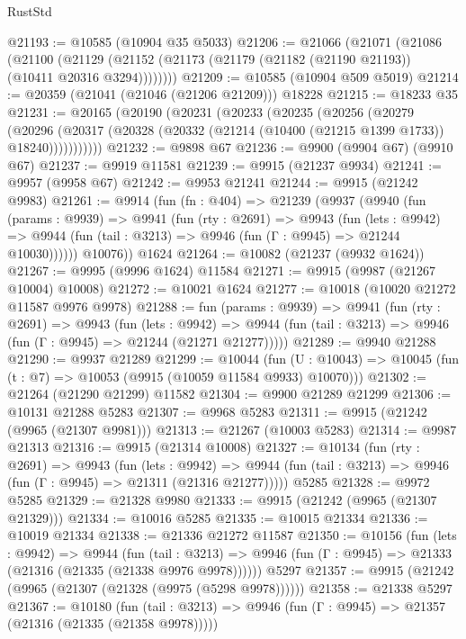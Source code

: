 \begin{lexlean}{RustStd}
\begin{coremodule}
@21193 := @10585 (@10904 @35 @5033)
@21206 := @21066
    (@21071
      (@21086
        (@21100
          (@21129 (@21152 (@21173 (@21179 (@21182 (@21190 @21193)) (@10411 @20316 @3294))))))))
@21209 := @10585 (@10904 @509 @5019)
@21214 := @20359 (@21041 (@21046 (@21206 @21209))) @18228
@21215 := @18233 @35
@21231 := @20165
    (@20190
      (@20231
        (@20233
          (@20235
            (@20256
              (@20279
                (@20296
                  (@20317 (@20328 (@20332 (@21214 (@10400 (@21215 @1399 @1733)) @18240)))))))))))
@21232 := @9898 @67
@21236 := @9900 (@9904 @67) (@9910 @67)
@21237 := @9919 @11581
@21239 := @9915 (@21237 @9934)
@21241 := @9957 (@9958 @67)
@21242 := @9953 @21241
@21244 := @9915 (@21242 @9983)
@21261 := @9914
    (fun (fn : @404) =>
    @21239
      (@9937
        (@9940
          (fun (params : @9939) =>
          @9941
            (fun (rty : @2691) =>
            @9943
              (fun (lets : @9942) =>
              @9944 (fun (tail : @3213) => @9946 (fun (Γ : @9945) => @21244 @10030))))))
        @10076))
    @1624
@21264 := @10082 (@21237 (@9932 @1624))
@21267 := @9995 (@9996 @1624) @11584
@21271 := @9915 (@9987 (@21267 @10004) @10008)
@21272 := @10021 @1624
@21277 := @10018 (@10020 @21272 @11587 @9976 @9978)
@21288 := fun (params : @9939) =>
  @9941
    (fun (rty : @2691) =>
    @9943
      (fun (lets : @9942) =>
      @9944 (fun (tail : @3213) => @9946 (fun (Γ : @9945) => @21244 (@21271 @21277)))))
@21289 := @9940 @21288
@21290 := @9937 @21289
@21299 := @10044
    (fun (U : @10043) => @10045 (fun (t : @7) => @10053 (@9915 (@10059 @11584 @9933) @10070)))
@21302 := @21264 (@21290 @21299) @11582
@21304 := @9900 @21289 @21299
@21306 := @10131 @21288 @5283
@21307 := @9968 @5283
@21311 := @9915 (@21242 (@9965 (@21307 @9981)))
@21313 := @21267 (@10003 @5283)
@21314 := @9987 @21313
@21316 := @9915 (@21314 @10008)
@21327 := @10134
    (fun (rty : @2691) =>
    @9943
      (fun (lets : @9942) =>
      @9944 (fun (tail : @3213) => @9946 (fun (Γ : @9945) => @21311 (@21316 @21277)))))
    @5285
@21328 := @9972 @5285
@21329 := @21328 @9980
@21333 := @9915 (@21242 (@9965 (@21307 @21329)))
@21334 := @10016 @5285
@21335 := @10015 @21334
@21336 := @10019 @21334
@21338 := @21336 @21272 @11587
@21350 := @10156
    (fun (lets : @9942) =>
    @9944
      (fun (tail : @3213) =>
      @9946 (fun (Γ : @9945) => @21333 (@21316 (@21335 (@21338 @9976 @9978))))))
    @5297
@21357 := @9915 (@21242 (@9965 (@21307 (@21328 (@9975 (@5298 @9978))))))
@21358 := @21338 @5297
@21367 := @10180
    (fun (tail : @3213) => @9946 (fun (Γ : @9945) => @21357 (@21316 (@21335 (@21358 @9978)))))

\end{coremodule}
\end{lexlean}
